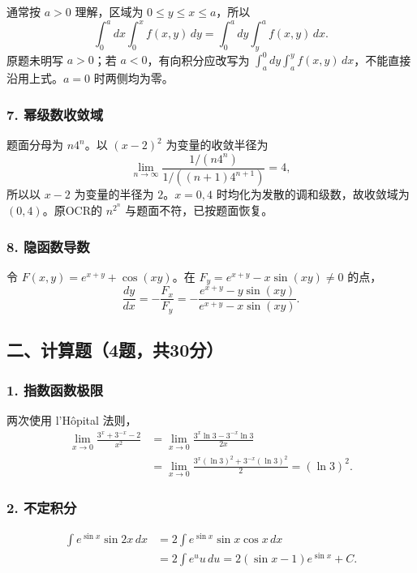 \documentclass[11pt,fontset=fandol]{ctexart}
\begin{document}
通常按 \(a>0\) 理解，区域为 \(0\le y\le x\le a\)，所以 \[
\int_0^a dx\int_0^xf(x,y)\,dy
=\int_0^a dy\int_y^af(x,y)\,dx.
\] 原题未明写 \(a>0\)；若 \(a<0\)，有向积分应改写为
\(\int_a^0dy\int_a^yf(x,y)\,dx\)，不能直接沿用上式。\(a=0\)
时两侧均为零。

\subsubsection{7.
幂级数收敛域}\label{ux5e42ux7ea7ux6570ux6536ux655bux57df}

题面分母为 \(n4^n\)。以 \((x-2)^2\) 为变量的收敛半径为 \[
\lim_{n\to\infty}\frac{1/(n4^n)}{1/((n+1)4^{n+1})}=4,
\] 所以以 \(x-2\) 为变量的半径为 \(2\)。\(x=0,4\)
时均化为发散的调和级数，故收敛域为 \((0,4)\)。原OCR的 \(n^{2^n}\)
与题面不符，已按题面恢复。

\subsubsection{8. 隐函数导数}\label{ux9690ux51fdux6570ux5bfcux6570}

令 \(F(x,y)=e^{x+y}+\cos(xy)\)。在 \(F_y=e^{x+y}-x\sin(xy)\ne0\) 的点，
\[
\frac{dy}{dx}=-\frac{F_x}{F_y}
=-\frac{e^{x+y}-y\sin(xy)}{e^{x+y}-x\sin(xy)}.
\]

\subsection{二、计算题（4题，共30分）}\label{ux4e8cux8ba1ux7b97ux98984ux9898ux517130ux5206}

\subsubsection{1.
指数函数极限}\label{ux6307ux6570ux51fdux6570ux6781ux9650}

两次使用 l'Hôpital 法则， \[
\begin{aligned}
\lim_{x\to0}\frac{3^x+3^{-x}-2}{x^2}
&=\lim_{x\to0}\frac{3^x\ln3-3^{-x}\ln3}{2x}\\
&=\lim_{x\to0}\frac{3^x(\ln3)^2+3^{-x}(\ln3)^2}{2}
=(\ln3)^2.
\end{aligned}
\]

\subsubsection{2. 不定积分}\label{ux4e0dux5b9aux79efux5206}

\[
\begin{aligned}
\int e^{\sin x}\sin2x\,dx
&=2\int e^{\sin x}\sin x\cos x\,dx\\
&=2\int e^u u\,du=2(\sin x-1)e^{\sin x}+C.
\end{aligned}
\]
\end{document}
